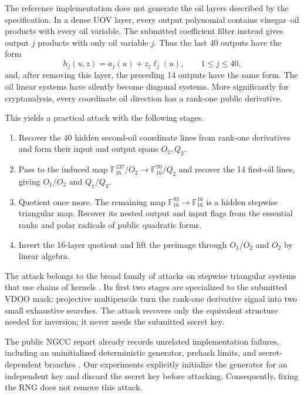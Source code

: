 \documentclass[11pt]{article}
\newcommand{\F}{\mathbb{F}}
\begin{document}
The reference implementation does not generate the oil layers described by
the specification.  In a dense UOV layer, every output polynomial contains
vinegar--oil products with every oil variable.  The submitted coefficient
filter instead gives output $j$ products with only oil variable $j$.  Thus the
last 40 outputs have the form
\[
       h_j(u,z)=a_j(u)+z_j\ell_j(u),\qquad 1\leq j\leq 40,
\]
and, after removing this layer, the preceding 14 outputs have the same form.
The oil linear systems have silently become diagonal systems.  More
significantly for cryptanalysis, every coordinate oil direction has a
rank-one public derivative.

This yields a practical attack with the following stages.
\begin{enumerate}[leftmargin=*,itemsep=2pt]
  \item Recover the 40 hidden second-oil coordinate lines from rank-one
        derivatives and form their input and output spans $O_2,Q_2$.
  \item Pass to the induced map
        $\F_{16}^{137}/O_2\rightarrow\F_{16}^{70}/Q_2$ and recover the 14
        first-oil lines, giving $O_1/O_2$ and $Q_1/Q_2$.
  \item Quotient once more.  The remaining map
        $\F_{16}^{83}\rightarrow\F_{16}^{16}$ is a hidden stepwise
        triangular map.  Recover its nested output and input flags from the
        essential ranks and polar radicals of public quadratic forms.
  \item Invert the 16-layer quotient and lift the preimage through $O_1/O_2$
        and $O_2$ by linear algebra.
\end{enumerate}

The attack belongs to the broad family of attacks on stepwise triangular
systems that use chains of kernels \cite{wolf-sts}.  Its first two stages are
specialized to the submitted VDOO mask: projective multipencils turn the
rank-one derivative signal into two small exhaustive searches.  The attack
recovers only the equivalent structure needed for inversion; it never needs
the submitted secret key.

The public NGCC report already records unrelated implementation failures,
including an uninitialized deterministic generator, prehash limits, and
secret-dependent branches \cite{ngcc-report}.  Our experiments explicitly
initialize the generator for an independent key and discard the secret key
before attacking.  Consequently, fixing the RNG does not remove this attack.
\end{document}
